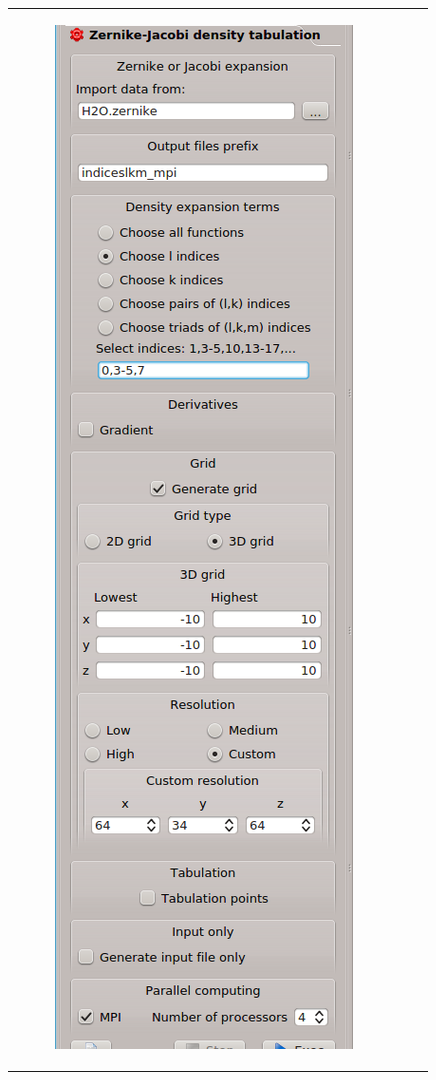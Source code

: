 \documentclass[10pt]{article}
\begin{document}
\begin{tabular}{lcr}
\begin{minipage}{.3\linewidth}
\begin{figure}[H]
\begin{center}
\vspace*{0mm}
\includegraphics[width=.7\linewidth]{damqt_fig_2_14_2.png}

\end{center}
\end{figure}
\end{minipage}
\end{tabular}
\end{document}
